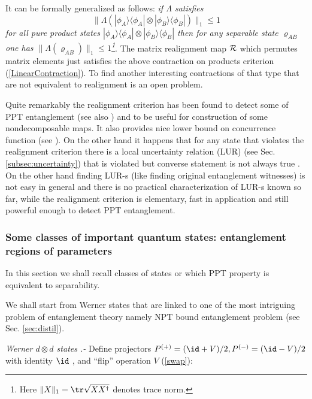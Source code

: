 \documentclass[rmp,12pt,preprint]{revtex4-2}
\begin{document}
It can be formally generalized as follows: {\it if $\Lambda$ satisfies
\begin{equation} \|\Lambda(|\phi_{A}\rangle\langle
\phi_{A}| \otimes |\phi_{B}\rangle\langle \phi_{B}|) \|_1\leq 1
\label{LinearContraction}
\end{equation}
for all pure product states $|\phi_{A}\rangle\langle \phi_{A}| \otimes
|\phi_{B}\rangle\langle \phi_{B}|$ then for any separable state
$\varrho_{AB}$ one has $\|\Lambda(\varrho_{AB})\|_1\leq 1$\footnote{
Here $\|X\|_1=\tr \sqrt{X X^\dagger}$ denotes trace norm.}}. The
matrix realignment map ${\cal R}$ which permutes matrix elements just
satisfies the above contraction on products criterion
(\ref{LinearContraction}). To find another interesting contractions of
that type that are not equivalent to realignment is an open problem.

Quite remarkably the realignment criterion has been found to detect
some of PPT entanglement \cite{ChenWu}(see also
\cite{Rudolph2003-JPA}) and to be useful for construction of some
nondecomposable maps. It also provides nice lower bound on concurrence
function (see \cite{AlbeverioLowerBoundPRL}). On the other hand it
happens that for any state that violates the realignment criterion
there is a local uncertainty relation (LUR) (see
Sec. \ref{subsec:uncertainty}) that is violated but converse statement
is not always true \cite{LURstrongerthanCCN}. On the other hand
finding LUR-s (like finding original entanglement witnesses) is not
easy in general and there is no practical characterization of LUR-s
known so far, while the realignment criterion is elementary, fast in
application and still powerful enough to detect PPT entanglement.


\subsubsection{Some classes of important quantum states: entanglement
regions of parameters}
\label{subsec:Werner_Iso}

In this section we shall recall classes of states or which PPT
property is equivalent to separability.

We shall start from Werner states that are linked to one of the most
intriguing problem of entanglement theory namely NPT bound
entanglement problem
\cite{DiVincenzoSSTT1999-nptbound,DurCLB1999-npt-bound} (see
Sec. \ref{sec:distil}).

{\it  Werner $d \otimes d$ states \cite{Werner1989} .-} Define
projectors $P^{(+)}=(\id + V)/ 2,P^{(-)}=(\id - V)/ 2$ with identity
$\id$ , and ``flip'' operation $V$ (\ref{swap}):
\end{document}
